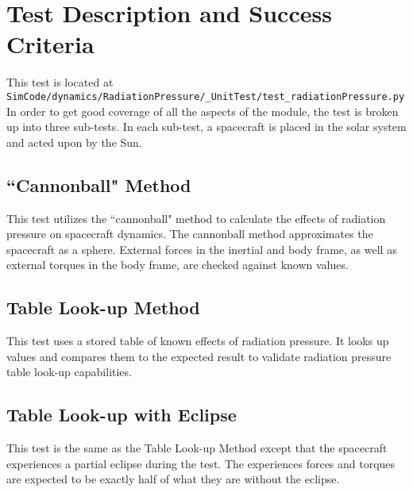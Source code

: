 \section{Test Description and Success Criteria}
This test is located at {\tt SimCode/dynamics/RadiationPressure/\_UnitTest/test\_radiationPressure.py} In order to get good coverage of all the aspects of the module, the test is broken up into three sub-tests. In each sub-test, a spacecraft is placed in the solar system and acted upon by the Sun. \par

\subsection{``Cannonball" Method} This test utilizes the ``cannonball" method to calculate the effects of radiation pressure on spacecraft dynamics. The cannonball method approximates the spacecraft as a sphere. External forces in the inertial and body frame, as well as external torques in the body frame, are checked against known values.
\subsection{Table Look-up Method} This test uses a stored table of known effects of radiation pressure. It looks up values and compares them to the expected result to validate radiation pressure table look-up capabilities.
\subsection{Table Look-up with Eclipse} This test is the same as the Table Look-up Method except that the spacecraft experiences a partial eclipse during the test. The experiences forces and torques are expected to be exactly half of what they are without the eclipse.